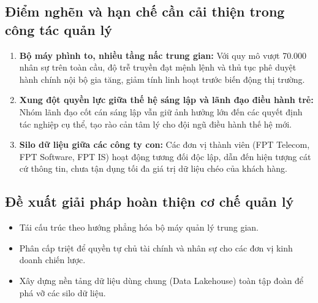 \subsection{Điểm nghẽn và hạn chế cần cải thiện trong công tác quản lý}
\begin{enumerate}
    \item \textbf{Bộ máy phình to, nhiều tầng nấc trung gian:} Với quy mô vượt 70.000 nhân sự trên toàn cầu, độ trễ truyền đạt mệnh lệnh và thủ tục phê duyệt hành chính nội bộ gia tăng, giảm tính linh hoạt trước biến động thị trường.
    \item \textbf{Xung đột quyền lực giữa thế hệ sáng lập và lãnh đạo điều hành trẻ:} Nhóm lãnh đạo cốt cán sáng lập vẫn giữ ảnh hưởng lớn đến các quyết định tác nghiệp cụ thể, tạo rào cản tâm lý cho đội ngũ điều hành thế hệ mới.
    \item \textbf{Silo dữ liệu giữa các công ty con:} Các đơn vị thành viên (FPT Telecom, FPT Software, FPT IS) hoạt động tương đối độc lập, dẫn đến hiện tượng cát cứ thông tin, chưa tận dụng tối đa giá trị dữ liệu chéo của khách hàng.
\end{enumerate}

\subsection{Đề xuất giải pháp hoàn thiện cơ chế quản lý}
\begin{itemize}
    \item Tái cấu trúc theo hướng phẳng hóa bộ máy quản lý trung gian.
    \item Phân cấp triệt để quyền tự chủ tài chính và nhân sự cho các đơn vị kinh doanh chiến lược.
    \item Xây dựng nền tảng dữ liệu dùng chung (Data Lakehouse) toàn tập đoàn để phá vỡ các silo dữ liệu.
\end{itemize}
